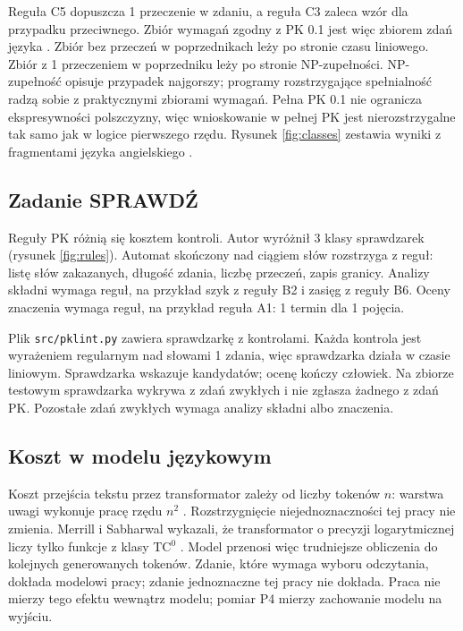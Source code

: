 \begin{remark}
Reguła C5 dopuszcza 1 przeczenie w zdaniu, a reguła C3 zaleca wzór  dla przypadku przeciwnego. Zbiór wymagań zgodny z PK 0.1 jest więc zbiorem zdań
języka . Zbiór bez przeczeń w poprzednikach leży po stronie czasu liniowego.
Zbiór z 1 przeczeniem w poprzedniku leży po stronie NP-zupełności. NP-zupełność opisuje przypadek najgorszy; programy
rozstrzygające spełnialność radzą sobie z praktycznymi zbiorami wymagań. Pełna PK 0.1
nie ogranicza ekspresywności polszczyzny, więc wnioskowanie w pełnej PK jest
nierozstrzygalne tak samo jak w logice pierwszego rzędu. Rysunek \ref{fig:classes}
zestawia wyniki z fragmentami języka angielskiego \cite{pratt2006}.
\end{remark}


\subsection{Zadanie SPRAWDŹ}
\label{sec:check}

Reguły PK różnią się kosztem kontroli. Autor wyróżnił 3 klasy sprawdzarek
(rysunek \ref{fig:rules}). Automat skończony nad ciągiem słów rozstrzyga \pkRulesRegular{}
z \pkRules{} reguł: listę słów zakazanych, długość zdania, liczbę przeczeń, zapis granicy.
Analizy składni wymaga \pkRulesSyntactic{} reguł, na przykład szyk z reguły B2 i zasięg
z reguły B6. Oceny znaczenia wymaga \pkRulesSemantic{} reguł, na przykład reguła A1:
1 termin dla 1 pojęcia.

Plik \texttt{src/pklint.py} zawiera sprawdzarkę z \pkLintChecks{} kontrolami. Każda
kontrola jest wyrażeniem regularnym nad słowami 1 zdania, więc sprawdzarka działa
w czasie liniowym. Sprawdzarka wskazuje kandydatów; ocenę kończy człowiek. Na zbiorze
testowym sprawdzarka wykrywa \pkLintDetected{} z \pkItems{} zdań zwykłych i nie zgłasza
żadnego z \pkItemsPkSentences{} zdań PK. Pozostałe \pkLintUndetected{} zdań zwykłych wymaga analizy składni
albo znaczenia.

\subsection{Koszt w modelu językowym}
\label{sec:cost}

Koszt przejścia tekstu przez transformator zależy od liczby tokenów $n$: warstwa uwagi
wykonuje pracę rzędu $n^2$ \cite{vaswani2017}. Rozstrzygnięcie niejednoznaczności tej pracy
nie zmienia. Merrill i Sabharwal wykazali, że transformator o precyzji logarytmicznej
liczy tylko funkcje z klasy TC$^0$ \cite{merrill2023}. Model przenosi więc trudniejsze
obliczenia do kolejnych generowanych tokenów. Zdanie, które wymaga wyboru odczytania,
dokłada modelowi pracy; zdanie jednoznaczne tej pracy nie dokłada. Praca nie mierzy tego
efektu wewnątrz modelu; pomiar P4 mierzy zachowanie modelu na wyjściu.

